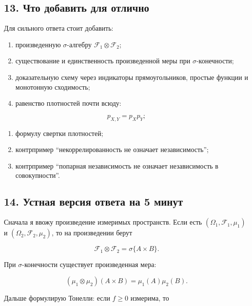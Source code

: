 \documentclass[
  11pt,
  a4paper,
]{article}
\providecommand{\tightlist}{%
  \setlength{\itemsep}{0pt}\setlength{\parskip}{0pt}}
\begin{document}
\subsection{13. Что добавить для
отлично}\label{ux447ux442ux43e-ux434ux43eux431ux430ux432ux438ux442ux44c-ux434ux43bux44f-ux43eux442ux43bux438ux447ux43dux43e}

Для сильного ответа стоит добавить:

\begin{enumerate}
\def\labelenumi{\arabic{enumi}.}
\tightlist
\item
  произведенную \(\sigma\)-алгебру \(\mathcal F_1\otimes\mathcal F_2\);
\item
  существование и единственность произведенной меры при
  \(\sigma\)-конечности;
\item
  доказательную схему через индикаторы прямоугольников, простые функции
  и монотонную сходимость;
\item
  равенство плотностей почти всюду:
\end{enumerate}

\[
p_{X,Y}=p_Xp_Y;
\]

\begin{enumerate}
\def\labelenumi{\arabic{enumi}.}
\setcounter{enumi}{4}
\tightlist
\item
  формулу свертки плотностей;
\item
  контрпример ``некоррелированность не означает независимость'';
\item
  контрпример ``попарная независимость не означает независимость в
  совокупности''.
\end{enumerate}

\subsection{14. Устная версия ответа на 5
минут}\label{ux443ux441ux442ux43dux430ux44f-ux432ux435ux440ux441ux438ux44f-ux43eux442ux432ux435ux442ux430-ux43dux430-5-ux43cux438ux43dux443ux442}

Сначала я ввожу произведение измеримых пространств. Если есть
\((\Omega_1,\mathcal F_1,\mu_1)\) и \((\Omega_2,\mathcal F_2,\mu_2)\),
то на произведении берут

\[
\mathcal F_1\otimes\mathcal F_2
=
\sigma\{A\times B\}.
\]

При \(\sigma\)-конечности существует произведенная мера:

\[
(\mu_1\otimes\mu_2)(A\times B)=\mu_1(A)\mu_2(B).
\]

Дальше формулирую Тонелли: если \(f\ge0\) измерима, то
\end{document}

